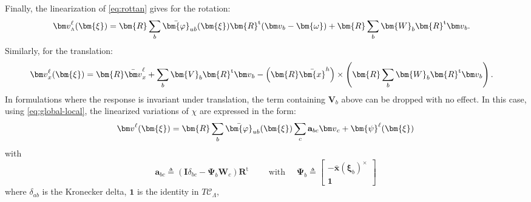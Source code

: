 Finally, the linearization of \eqref{eq:rottan} gives for the rotation:
%
\begin{equation*} 
\begin{aligned}
\VarConfig_{\scriptscriptstyle{\Lambda}}^{\ell}(\bm{\xi})
&= \bm{R} \sum_b
   \bar{\bm{\varphi}}_{u b}(\bm{\xi}) \bm{R}^{\mathrm{t}} (\VarConfig_b - \bm{\omega}) 
  + \bm{R} \sum_b \bm{W}_b \bm{R}^{\mathrm{t}}\VarConfig_b .
\end{aligned}
\end{equation*}
Similarly, for the translation:
%
\begin{equation*} 
\begin{aligned}
\VarConfig_x^{\ell}(\bm{\xi})
&= \bm{R} \bar{\VarConfig}_x^{\ell} + \sum_b \bm{V}_b \bm{R}^{\mathrm{t}} \VarConfig_b
   - \left(\bm{R}\bar{\bm{x}}^h\right)\times \left(\bm{R} \sum_b \bm{W}_b \bm{R}^{\mathrm{t}}\VarConfig_b\right) .
\end{aligned}
\end{equation*}
In formulations where the response is invariant under translation, the term containing
\(\bm{V}_b\) above can be dropped with no effect. In this case, using
\eqref{eq:global-local}, %
the linearized variations of \(\chi\) are expressed %
in the form:
%
\begin{equation}
\VarConfig^{\ell}(\bm{\xi}) = \bm{R} \sum_b
   \bar{\bm{\varphi}}_{u b}(\bm{\xi}) \sum_c \mathbf{a}_{b c} \VarConfig_c
  + \bm{\psi}^{\ell}(\bm{\xi})
\label{eq:global-u}
\end{equation}
with
\begin{equation}
\mathbf{a}_{bc} \triangleq \left(\bm{I} \delta_{b c}- \bm{\Psi}_b \bm{W}_c\right)\bm{R}^{\mathrm{t}}
\qquad\text{ with }\quad
\bm{\Psi}_b \triangleq \left[\begin{array}{c}
-\bar{\bm{x}}(\bm{\xi}_b)^{\times} \\ \mathbf{1}
\end{array}\right]
\label{eq:projector}
\end{equation}
where \(\delta_{a b}\) is the Kronecker delta, \(\mathbf{1}\) is the identity in \(T \mathscr{C}_{\scriptscriptstyle{\Lambda}}\),
